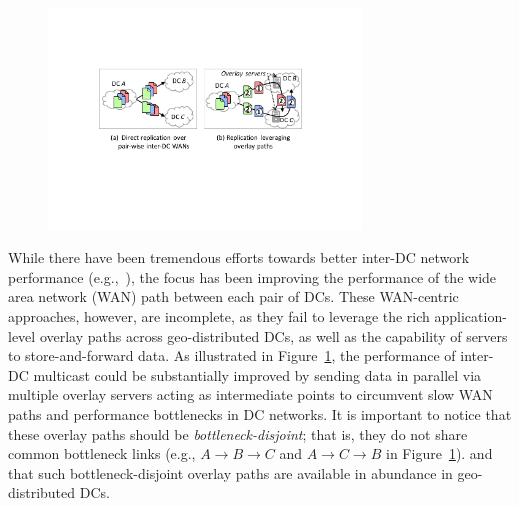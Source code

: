 \begin{figure}[htbp]
\includegraphics[width=83mm]{images/intro-example-3.pdf}
\vspace{-0.4cm}
\label{fig:intro}
\vspace{-0.4cm}
\end{figure}

While there have been tremendous efforts towards better inter-DC
network performance (e.g.,~\cite{savage1999Theend,jain2013b4,
kumar2015bwe,hong2013achieving,zhang2015guarantee,zhang2017going}), the focus has
been improving the performance of the wide area network (WAN) path
between each pair of DCs. These WAN-centric approaches, however, are
incomplete, as they fail to leverage the rich application-level
overlay paths across geo-distributed DCs, as well as the capability
of servers to store-and-forward data.
As illustrated in Figure~\ref{fig:intro}, the performance of inter-DC
multicast could be substantially improved by sending data in parallel
via multiple overlay servers acting as intermediate points to
circumvent slow WAN paths and performance bottlenecks in DC networks.
It is important to notice that these overlay paths should be {\em
bottleneck-disjoint}; that is, they do not share common bottleneck
links (e.g., $A$$\rightarrow$$B$$\rightarrow$$C$ and
$A$$\rightarrow$$C$$\rightarrow$$B$ in Figure~\ref{fig:intro}).
and that such bottleneck-disjoint overlay paths are available in
abundance in geo-distributed DCs.




